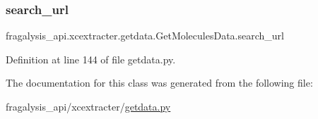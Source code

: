 \subsubsection{\texorpdfstring{search\+\_\+url}{search\_url}}
{\footnotesize\ttfamily fragalysis\+\_\+api.\+xcextracter.\+getdata.\+Get\+Molecules\+Data.\+search\+\_\+url}



Definition at line 144 of file getdata.\+py.



The documentation for this class was generated from the following file\+:\begin{DoxyCompactItemize}
\item 
fragalysis\+\_\+api/xcextracter/\hyperlink{getdata_8py}{getdata.\+py}\end{DoxyCompactItemize}
